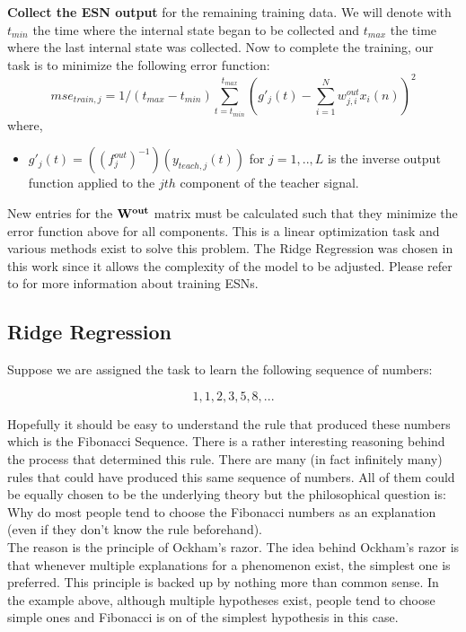 \documentclass[letterpaper,9pt]{article}
\begin{document}
{\bf Collect the ESN output} for the remaining training data. We will denote with $t_{min}$ the time where the internal state began to be collected and $t_{max}$ the time where the last internal state was collected. Now to complete the training, our task is to minimize the following error function:
\[
mse_{train,j} = 1/(t_{max}-t_{min})\sum_{t=t_{min}}^{t_{max}}(g'_j(t) - \sum_{i=1}^{N}w_{j,i}^{out}x_i(n))^2
\]
where, 
\begin{itemize}
  \item $g'_j(t)=((f_j^{out})^{-1})(y_{teach,j}(t))$ for $j=1,..,L$ is the inverse output function applied to the $jth$ component of the teacher signal. 
\end{itemize}

New entries for the ${\bf W^{out}}$ matrix must be calculated such that they minimize the error function above for all components. This is a linear optimization task and various methods exist to solve this problem. The Ridge Regression was chosen in this work since it allows the complexity of the model to be adjusted. Please refer to \cite{JaegerESNTutorial} for more information about training ESNs.

\subsection{Ridge Regression}

Suppose we are assigned the task to learn the following sequence of numbers:

\[
  1,1,2,3,5,8,...
\]

Hopefully it should be easy to understand the rule that produced these numbers which is the Fibonacci Sequence. There is a rather interesting reasoning behind the process that determined this rule. There are many (in fact infinitely many) rules that could have produced this same sequence of numbers. All of them could be equally chosen to be the underlying theory but the philosophical question is: Why do most people tend to choose the Fibonacci numbers as an explanation (even if they don't know the rule beforehand).\\

The reason is the principle of Ockham's razor. The idea behind Ockham's razor is that whenever multiple explanations for a phenomenon exist, the simplest one is preferred. This principle is backed up by nothing more than common sense. In the example above, although multiple hypotheses exist, people tend to choose simple ones and Fibonacci is on of the simplest hypothesis in this case.\\
\end{document}
